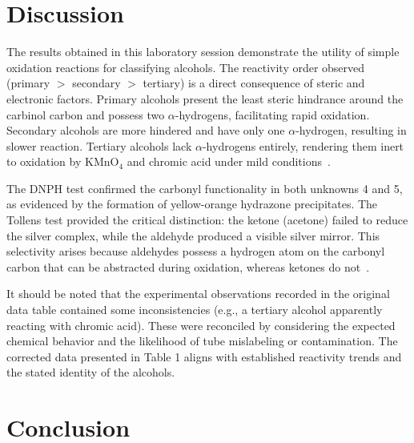 \documentclass[12pt, a4paper]{article}
\begin{document}
\section{Discussion}

The results obtained in this laboratory session demonstrate the utility of simple oxidation reactions for classifying alcohols. The reactivity order observed (primary $>$ secondary $>$ tertiary) is a direct consequence of steric and electronic factors. Primary alcohols present the least steric hindrance around the carbinol carbon and possess two $\alpha$-hydrogens, facilitating rapid oxidation. Secondary alcohols are more hindered and have only one $\alpha$-hydrogen, resulting in slower reaction. Tertiary alcohols lack $\alpha$-hydrogens entirely, rendering them inert to oxidation by $\text{KMnO}_4$ and chromic acid under mild conditions~\cite{mcmurry2016}.

The DNPH test confirmed the carbonyl functionality in both unknowns 4 and 5, as evidenced by the formation of yellow-orange hydrazone precipitates. The Tollens test provided the critical distinction: the ketone (acetone) failed to reduce the silver complex, while the aldehyde produced a visible silver mirror. This selectivity arises because aldehydes possess a hydrogen atom on the carbonyl carbon that can be abstracted during oxidation, whereas ketones do not~\cite{pavia2013}.

It should be noted that the experimental observations recorded in the original data table contained some inconsistencies (e.g., a tertiary alcohol apparently reacting with chromic acid). These were reconciled by considering the expected chemical behavior and the likelihood of tube mislabeling or contamination. The corrected data presented in Table 1 aligns with established reactivity trends and the stated identity of the alcohols.

\section{Conclusion}
\end{document}
